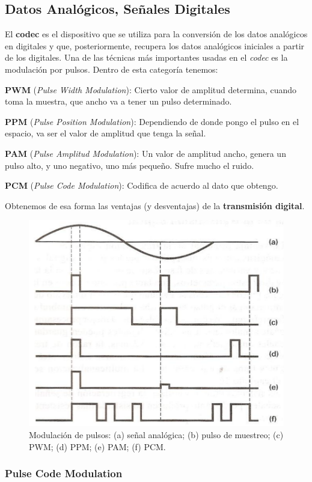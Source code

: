 \documentclass[10pt,a4paper]{article}
\begin{document}
\subsection{Datos Analógicos, Señales Digitales}

El \textbf{codec} es el dispositivo que se utiliza para la conversión de los datos analógicos en digitales y que, posteriormente, recupera los datos analógicos iniciales a partir de los digitales. Una de las técnicas más importantes usadas en el \textit{codec} es la modulación por pulsos. Dentro de esta categoría tenemos:
\begin{description}
\item \textbf{PWM} (\textit{Pulse Width Modulation}): Cierto valor de amplitud determina, cuando toma la muestra, que ancho va a tener un pulso determinado.
\item \textbf{PPM} (\textit{Pulse Position Modulation}): Dependiendo de donde pongo el pulso en el espacio, va ser el valor de amplitud que tenga la señal.
\item \textbf{PAM} (\textit{Pulse Amplitud Modulation}): Un valor de amplitud ancho, genera un pulso alto, y uno negativo, uno más pequeño. Sufre mucho el ruido.
\item \textbf{PCM} (\textit{Pulse Code Modulation}): Codifica de acuerdo al dato que obtengo.
\end{description}

Obtenemos de esa forma las ventajas (y desventajas) de la \textbf{transmisión digital}.

\pagebreak

\begin{figure}
  \caption{Modulación de pulsos: (a) señal analógica; (b) pulso de muestreo; (c) PWM; (d) PPM; (e) PAM; (f) PCM.}
  \label{fig:pulsos}  
  \centerline{
	\includegraphics[width=0.4\textwidth-\fboxrule-\fboxrule]{imgs/pulsos.png}}
\end{figure}

\subsubsection{Pulse Code Modulation}
\end{document}
